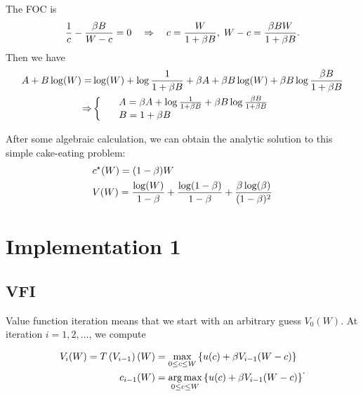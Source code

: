 \documentclass[12pt]{article}
\theoremstyle{definition}
\begin{document}
The FOC is 
\begin{equation}
    \notag 
    \frac{1}{c}-\frac{\beta B}{W-c}=0 \quad \Rightarrow \quad c=\frac{W}{1+\beta B},\; W-c=\frac{\beta B W}{1+\beta B}.
\end{equation}
Then we have 
\begin{equation}
    \notag 
    \begin{aligned}
    A+B \log (W)= & \log (W)+\log \frac{1}{1+\beta B}+\beta A+\beta B \log (W)+\beta B \log \frac{\beta B}{1+\beta B} \\
    \Rightarrow & \left\{\
    \begin{array}{ll}
        & A=\beta A+\log \frac{1}{1+\beta B}+\beta B \log \frac{\beta B}{1+\beta B} \\
        & B=1+\beta B 
    \end{array}\right.
    \end{aligned}
\end{equation}

After some algebraic calculation, we can obtain the analytic solution to this simple cake-eating problem:
\begin{equation}
    \notag 
    \begin{aligned}
    & c^{\star}(W)=(1-\beta) W \\
    & V(W)=\frac{\log (W)}{1-\beta}+\frac{\log (1-\beta)}{1-\beta}+\frac{\beta \log (\beta)}{(1-\beta)^2}
    \end{aligned}
\end{equation}

\section{Implementation 1}

\subsection{VFI}

Value function iteration means that we start with an arbitrary guess $V_0(W)$. At iteration $i = 1, 2, \ldots$, we compute 

\begin{equation}
    \notag 
    \begin{aligned}
    V_i(W)=T\left(V_{i-1}\right)(W) & =\max _{0 \leq c \leq W}\left\{u(c)+\beta V_{i-1}(W-c)\right\} \\
    c_{i-1}(W) & =\underset{0 \leq c \leq W}{\arg \max }\left\{u(c)+\beta V_{i-1}(W-c)\right\}
    \end{aligned}.
\end{equation}
\end{document}
